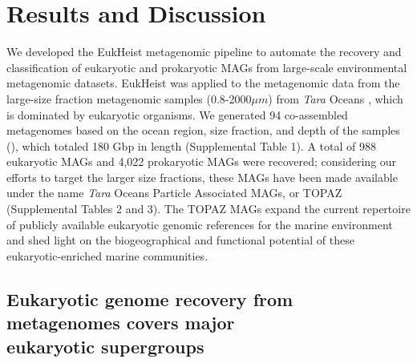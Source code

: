 \documentclass[12pt]{article}
\numberwithin{equation}{section}
\begin{document}
\section*{Results and Discussion}

We developed the EukHeist metagenomic pipeline to automate the recovery and classification of eukaryotic and prokaryotic MAGs from large-scale environmental metagenomic datasets. EukHeist was applied to the metagenomic data from the large-size fraction metagenomic samples (0.8-2000$\mu m$)  from \textit{Tara} Oceans \citep{Carradec2018global}, which is dominated by eukaryotic organisms. We generated 94 co-assembled metagenomes based on the ocean region, size fraction, and depth of the samples (), which totaled 180 Gbp in length (Supplemental Table 1).  A total of 988 eukaryotic MAGs and 4,022 prokaryotic MAGs were recovered; considering our efforts to target the larger size fractions, these MAGs have been made available under the name \textit{Tara} Oceans Particle Associated MAGs, or TOPAZ (Supplemental Tables 2 and 3). The TOPAZ MAGs expand the current repertoire of publicly available eukaryotic genomic references for the marine environment and shed light on the biogeographical and functional potential of these eukaryotic-enriched marine communities. 

\subsection*{Eukaryotic genome recovery from metagenomes covers major \\ eukaryotic supergroups}
\end{document}

